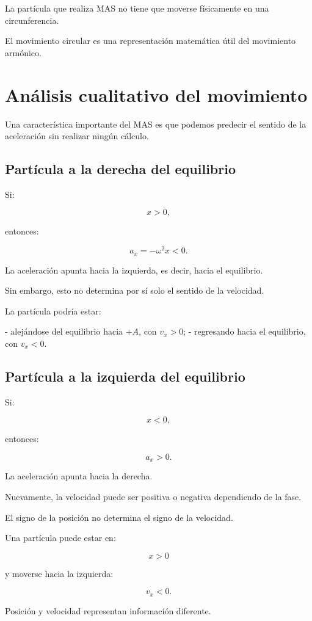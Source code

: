 \begin{advertencia}
La partícula que realiza MAS no tiene que moverse físicamente en una circunferencia.

El movimiento circular es una representación matemática útil del movimiento armónico.
\end{advertencia}

\section{Análisis cualitativo del movimiento}

Una característica importante del MAS es que podemos predecir el sentido de la aceleración sin realizar ningún cálculo.

\subsection{Partícula a la derecha del equilibrio}

Si:

\[ x>0, \]

entonces:

\[ a_x=-\omega^2x<0. \]

La aceleración apunta hacia la izquierda, es decir, hacia el equilibrio.

Sin embargo, esto no determina por sí solo el sentido de la velocidad.

La partícula podría estar:

- alejándose del equilibrio hacia \(+A\), con \(v_x>0\);
- regresando hacia el equilibrio, con \(v_x<0\).

\subsection{Partícula a la izquierda del equilibrio}

Si:

\[ x<0, \]

entonces:

\[ a_x>0. \]

La aceleración apunta hacia la derecha.

Nuevamente, la velocidad puede ser positiva o negativa dependiendo de la fase.

\begin{errorfrecuente}
El signo de la posición no determina el signo de la velocidad.

Una partícula puede estar en:

\[ x>0 \]

y moverse hacia la izquierda:

\[ v_x<0. \]

Posición y velocidad representan información diferente.
\end{errorfrecuente}

